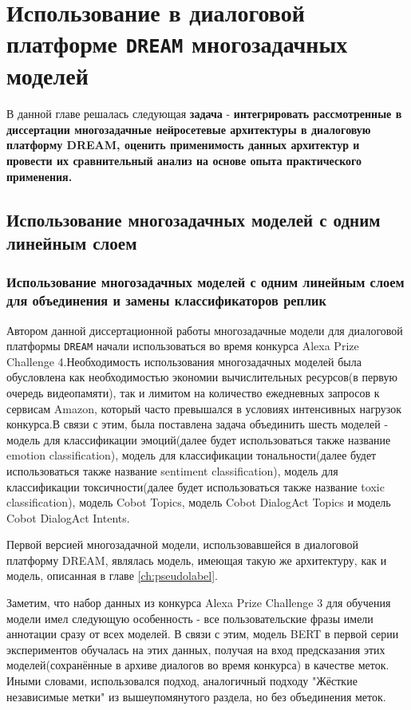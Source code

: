   \chapter{  Использование в диалоговой платформе \texttt{DREAM} многозадачных моделей}\label{ch:mtldream}
В данной главе решалась следующая \textbf{задача} - \textbf{интегрировать рассмотренные в диссертации многозадачные нейросетевые архитектуры в диалоговую платформу DREAM, оценить применимость данных архитектур и провести их сравнительный анализ на основе опыта практического применения.}

\section{Использование многозадачных моделей с одним линейным слоем }
\subsection{Использование многозадачных моделей с одним линейным слоем для объединения и замены классификаторов реплик}
Автором данной диссертационной работы многозадачные модели для диалоговой платформы \texttt{DREAM} начали использоваться во время конкурса Alexa Prize Challenge 4.Необходимость использования многозадачных моделей была обусловлена как необходимостью экономии вычислительных ресурсов(в первую очередь видеопамяти),
так и лимитом на количество ежедневных запросов к сервисам Amazon, который часто превышался в условиях интенсивных нагрузок конкурса.В связи с этим, была поставлена задача объединить шесть моделей - модель для классификации эмоций(далее будет использоваться также название emotion classification), модель для классификации тональности(далее будет использоваться также название sentiment classification), модель для классификации токсичности(далее будет использоваться также название toxic classification), модель Cobot Topics, модель Cobot DialogAct Topics и модель Cobot DialogAct Intents. 

Первой версией многозадачной модели, использовавшейся в диалоговой платформу DREAM, являлась модель, имеющая такую же архитектуру,
как и модель, описанная в главе \ref{ch:pseudolabel}.

Заметим, что набор данных из конкурса Alexa Prize Challenge 3 для обучения модели имел следующую особенность - все пользовательские фразы имели аннотации сразу от всех моделей. В связи с этим, модель BERT в первой серии экспериментов обучалась на этих данных, получая на вход предсказания этих моделей(сохранённые в архиве диалогов во время конкурса) в качестве меток. Иными словами, использовался подход, аналогичный подходу "Жёсткие независимые метки" из вышеупомянутого раздела, но без объединения меток. 
 
